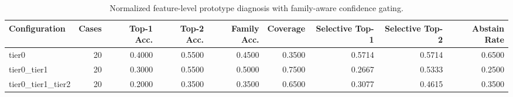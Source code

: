 \begin{table}[t]
\centering
\caption{Normalized feature-level prototype diagnosis with family-aware confidence gating.}
\label{tab:dice_stressor_hierarchical_diagnosis}
\footnotesize
\begin{tabular}{lrrrrrrrr}
\toprule
Configuration & Cases & Top-1 Acc. & Top-2 Acc. & Family Acc. & Coverage & Selective Top-1 & Selective Top-2 & Abstain Rate \\
\midrule
tier0 & 20 & 0.4000 & 0.5500 & 0.4500 & 0.3500 & 0.5714 & 0.5714 & 0.6500 \\
tier0_tier1 & 20 & 0.3000 & 0.5500 & 0.5000 & 0.7500 & 0.2667 & 0.5333 & 0.2500 \\
tier0_tier1_tier2 & 20 & 0.2000 & 0.3500 & 0.3500 & 0.6500 & 0.3077 & 0.4615 & 0.3500 \\
\bottomrule
\end{tabular}

\end{table}
